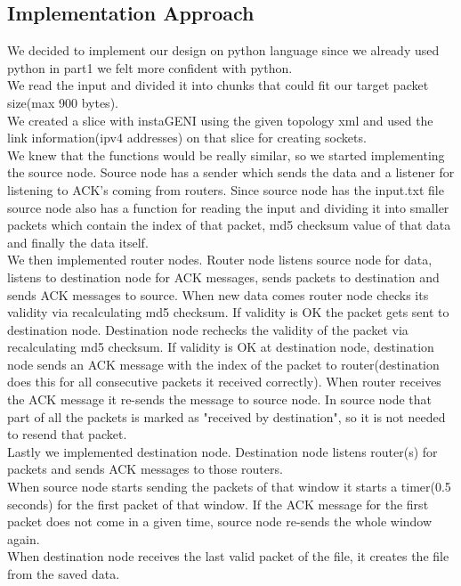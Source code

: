 \documentclass[conference]{IEEEtran}
\begin{document}
\subsection{Implementation Approach}
We decided to implement our design on python language since we already used python in part1 we felt more confident with python. \\ 
We read the input and divided it into chunks that could fit our target packet size(max 900 bytes). \\
We created a slice with instaGENI using the given topology xml and used the link information(ipv4 addresses) on that slice for creating sockets. \\
We knew that the functions would be really similar, so we started implementing the source node. Source node has a sender which sends the data and a listener for listening to ACK's coming from routers. Since source node has the input.txt file source node also has a function for reading the input and dividing it into smaller packets which contain the index of that packet, md5 checksum value of that data and finally the data itself. \\
We then implemented router nodes. Router node listens source node for data, listens to destination node for ACK messages, sends packets to destination and sends ACK messages to source. When new data comes router node checks its validity via recalculating md5 checksum. If validity is OK the packet gets sent to destination node. Destination node rechecks the validity of the packet via recalculating md5 checksum. If validity is OK at destination node, destination node sends an ACK message with the index of the packet to router(destination does this for all consecutive packets it received correctly). When router receives the ACK message it re-sends the message to source node. In source node that part of all the packets is marked as "received by destination", so it is not needed to resend that packet. \\
Lastly we implemented destination node. Destination node listens router(s) for packets and sends ACK messages to those routers. \\
When source node starts sending the packets of that window it starts a timer(0.5 seconds) for the first packet of that window. If the ACK message for the first packet does not come in a given time, source node re-sends the whole window again. \\
When destination node receives the last valid packet of the file, it creates the file from the saved data.\\
\end{document}
